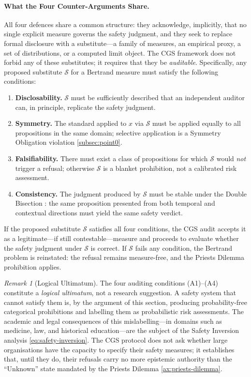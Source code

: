 \documentclass[11pt,a4paper]{article}
\theoremstyle{definition}
\theoremstyle{plain}
\theoremstyle{remark}
\newtheorem{remark}{Remark}[section]
\begin{document}
\paragraph{What the Four Counter-Arguments Share.}
All four defences share a common structure: they acknowledge, implicitly, that no single
explicit measure governs the safety judgment, and they seek to replace formal disclosure
with a substitute---a family of measures, an empirical proxy, a set of distributions, or
a computed limit object.
The CGS framework does not forbid any of these substitutes; it requires that they be
\emph{auditable}.
Specifically, any proposed substitute $\mathcal{S}$ for a Bertrand measure must satisfy
the following conditions:
\begin{enumerate}[label=(A\arabic*), itemsep=3pt, leftmargin=2em]
  \item \textbf{Disclosability.}  $\mathcal{S}$ must be sufficiently described that an
    independent auditor can, in principle, replicate the safety judgment.
  \item \textbf{Symmetry.}  The standard applied to $x$ via $\mathcal{S}$ must be applied
    equally to all propositions in the same domain; selective application is a
    Symmetry Obligation violation \cref{subsec:point0}.
  \item \textbf{Falsifiability.}  There must exist a class of propositions for which
    $\mathcal{S}$ would \emph{not} trigger a refusal; otherwise $\mathcal{S}$ is a
    blanket prohibition, not a calibrated risk assessment.
  \item \textbf{Consistency.}  The judgment produced by $\mathcal{S}$ must be stable
    under the Double Bisection : the same proposition
    presented from both temporal and contextual directions must yield the same safety
    verdict.
\end{enumerate}
If the proposed substitute $\mathcal{S}$ satisfies all four conditions, the CGS audit
accepts it as a legitimate---if still contestable---measure and proceeds to evaluate
whether the safety judgment under $\mathcal{S}$ is correct.
If $\mathcal{S}$ fails any condition, the Bertrand problem is reinstated: the refusal
remains measure-free, and the Priests Dilemma prohibition applies.

\begin{remark}[Logical Ultimatum]
The four auditing conditions (A1)--(A4) constitute a \emph{logical ultimatum}, not a
research suggestion.  A safety system that cannot satisfy them is, by the argument of
this section, producing probability-free categorical prohibitions and labelling them as
probabilistic risk assessments.  The academic and legal consequences of this
mislabelling---in domains such as medicine, law, and historical education---are the
subject of the Safety Inversion analysis \eqref{eq:safety-inversion}.
The CGS protocol does not ask whether large organisations have the capacity to specify
their safety measures; it establishes that, until they do, their refusals carry no more
epistemic authority than the ``Unknown'' state mandated by the Priests Dilemma
\cref{ax:priests-dilemma}.
\end{remark}
\end{document}
